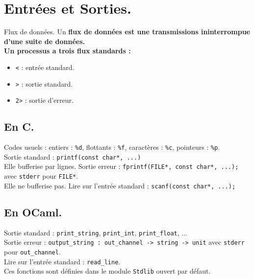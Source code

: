 \documentclass[french, 11pt]{article}
\begin{document}
\section{Entrées et Sorties.}

\begin{defi}{Flux de données.}{}
    Un \bf{flux de données} est une transmissions ininterrompue d'une suite de données.\\
    Un processus a trois flux standards :
    \begin{itemize}[label=---, topsep=0pt,itemsep=-0.9 ex]
        \item \texttt{<} : entrée standard.
        \item \texttt{>} : sortie standard.
        \item \texttt{2>} : sortie d'erreur.
    \end{itemize}
\end{defi}

\subsection{En C.}

\begin{defi}{}{}
    Codes usuels :  entiers : \texttt{\%d}, flottants : \texttt{\%f}, caractères : \texttt{\%c}, pointeurs : \texttt{\%p}.\\
    Sortie standard : \texttt{printf(const char*, ...)}\\
    Elle bufferise par lignes.\n
    Sortie erreur : \texttt{fprintf(FILE*, const char*, ...);} avec \texttt{stderr} pour \texttt{FILE*}.\\
    Elle ne bufferise pas.\n
    Lire sur l'entrée standard : \texttt{scanf(const char*, ...);}
\end{defi}

\subsection{En OCaml.}

\begin{defi}{}{}
    Sortie standard : \texttt{print\_string}, \texttt{print\_int}, \texttt{print\_float}, ...\\
    Sortie erreur : \texttt{output\_string : out\_channel -> string -> unit} avec \texttt{stderr} pour \texttt{out\_channel}.\\
    Lire sur l'entrée standard : \texttt{read\_line}.\\
    Ces fonctions sont définies dans le module \texttt{Stdlib} ouvert par défaut.
\end{defi}
\end{document}
